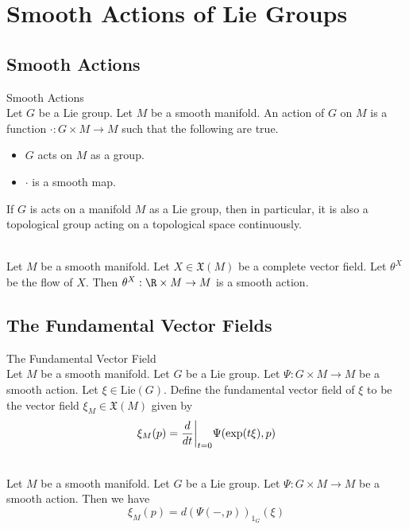 \documentclass[a4paper]{article}
\begin{document}
\pagebreak
\section{Smooth Actions of Lie Groups}
\subsection{Smooth Actions}
\begin{defn}{Smooth Actions}{}\\
Let $G$ be a Lie group. Let $M$ be a smooth manifold. An action of $G$ on $M$ is a function $\cdot:G\times M\to M$ such that the following are true. 
\begin{itemize}
\item $G$ acts on $M$ as a group. 
\item $\cdot$ is a smooth map. 
\end{itemize}
\end{defn}

If $G$ is acts on a manifold $M$ as a Lie group, then in particular, it is also a topological group acting on a topological space continuously. 

\begin{eg}{}{}\\
Let $M$ be a smooth manifold. Let $X\in\mathfrak{X}(M)$ be a complete vector field. Let $\theta^X$ be the flow of $X$. Then $\theta^X:\R\times M\to M$ is a smooth action. 
\end{eg}

\subsection{The Fundamental Vector Fields}
\begin{defn}{The Fundamental Vector Field}{}\\
Let $M$ be a smooth manifold. Let $G$ be a Lie group. Let $\Psi:G\times M\to M$ be a smooth action. Let $\xi\in\text{Lie}(G)$. Define the fundamental vector field of $\xi$ to be the vector field $\xi_M\in\mathfrak{X}(M)$ given by $$\xi_M(p)=\frac{d}{dt}\bigg{|}_{t=0}\Psi(\text{exp}(t\xi),p)$$
\end{defn}

\begin{prp}{}{}\\
Let $M$ be a smooth manifold. Let $G$ be a Lie group. Let $\Psi:G\times M\to M$ be a smooth action. Then we have $$\xi_M(p)=d(\Psi(-,p))_{1_G}(\xi)$$
\end{prp}
\end{document}
